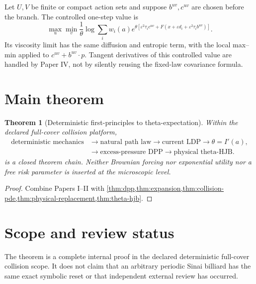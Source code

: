\documentclass[11pt,reqno]{amsart}
\newtheorem{theorem}{Theorem}[section]
\theoremstyle{remark}
\begin{document}
Let $U,V$ be finite or compact action sets and suppose $b^{uv},c^{uv}$ are
chosen before the branch.  The controlled one-step value is
\[
 \max_u\min_v\frac1\theta\log\sum_iw_i(a)e^{\theta[
 \varepsilon^2\tau_i c^{uv}+F(x+\varepsilon d_i+
 \varepsilon^2\tau_i b^{uv})]}.
\]
Its viscosity limit has the same diffusion and entropic term, with the local
max--min applied to $c^{uv}+b^{uv}\cdot p$.  Tangent derivatives of this
controlled value are handled by Paper IV, not by silently reusing the fixed-law
covariance formula.

\section{Main theorem}
\begin{theorem}[Deterministic first-principles to theta-expectation]\label{thm:main}
Within the declared full-cover collision platform,
\[
\begin{aligned}
 \text{deterministic mechanics}
 &\to \text{natural path law}
 \to \text{current LDP}
 \to \theta=I'(a),\\
 &\to \text{excess-pressure DPP}
 \to \text{physical theta-HJB}.
\end{aligned}
\]
is a closed theorem chain.  Neither Brownian forcing nor exponential utility
nor a free risk parameter is inserted at the microscopic level.
\end{theorem}
\begin{proof}
Combine Papers I--II with
\cref{thm:dpp,thm:expansion,thm:collision-pde,thm:physical-replacement,thm:theta-hjb}.
\end{proof}

\section*{Scope and review status}
The theorem is a complete internal proof in the declared deterministic
full-cover collision scope.  It does not claim that an arbitrary periodic
Sinai billiard has the same exact symbolic reset or that independent external
review has occurred.



\end{document}
